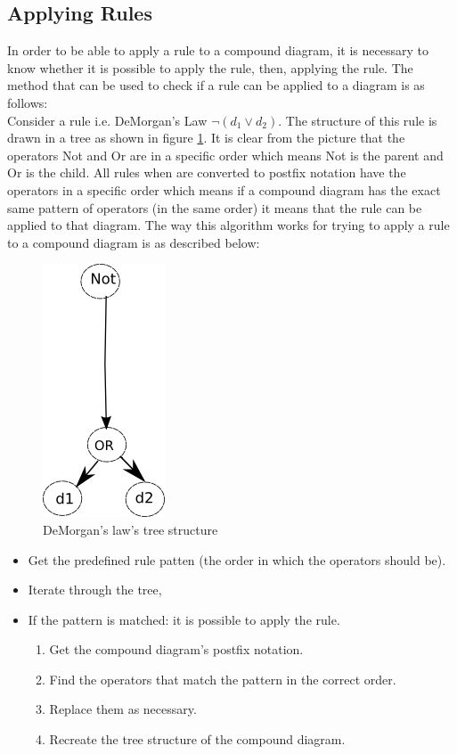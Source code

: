 \documentclass[10pt, a4paper, titlepage]{article}
\begin{document}
\subsection{Applying Rules}
In order to be able to apply a rule to a compound diagram, it is necessary to know whether it is possible to apply the rule, then, applying the rule. The method that can be used to check if a rule can be applied to a diagram is as follows:\\
Consider a rule i.e. DeMorgan's Law $ \neg (d_{1} \vee d_{2})$. The structure of this rule is drawn in a tree as shown in figure \ref{fig:dem}. It is clear from the picture that the operators Not and Or are in a specific order which means Not is the parent and Or is the child. All rules when are converted to postfix notation have the operators in a specific order which means if a compound diagram has the exact same pattern of operators (in the same order) it means that the rule can be applied to that diagram. The way this algorithm works for trying to apply a rule to a compound diagram is as described below:

\begin{figure}[h]
\centering
\includegraphics[scale=0.6]{images/dem.png}
\caption{DeMorgan's law's tree structure}
\label{fig:dem}
\end{figure}

\begin{itemize}
\item Get the predefined rule patten (the order in which the operators should be).
\item Iterate through the tree,
\item If the pattern is matched: it is possible to apply the rule.
\begin{enumerate}
\item Get the compound diagram's postfix notation.
\item Find the operators that match the pattern in the correct order.
\item Replace them as necessary.
\item Recreate the tree structure of the compound diagram.
\end{enumerate}
\end{itemize}
\end{document}
